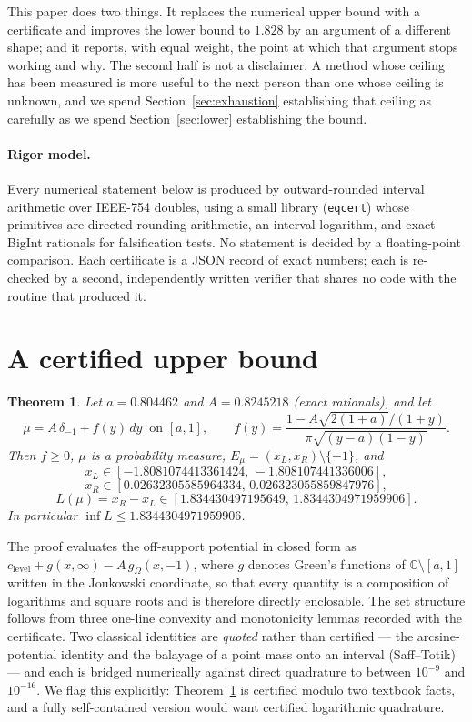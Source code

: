 \documentclass[11pt]{article}
\newtheorem{theorem}{Theorem}
\begin{document}
This paper does two things. It replaces the numerical upper bound with a
certificate and improves the lower bound to $1.828$ by an argument of a
different shape; and it reports, with equal weight, the point at which
that argument stops working and why. The second half is not a
disclaimer. A method whose ceiling has been measured is more useful to
the next person than one whose ceiling is unknown, and we spend
Section~\ref{sec:exhaustion} establishing that ceiling as carefully as we
spend Section~\ref{sec:lower} establishing the bound.

\paragraph{Rigor model.} Every numerical statement below is produced by
outward-rounded interval arithmetic over IEEE-754 doubles, using a small
library (\texttt{eqcert}) whose primitives are directed-rounding
arithmetic, an interval logarithm, and exact BigInt rationals for
falsification tests. No statement is decided by a floating-point
comparison. Each certificate is a JSON record of exact numbers; each is
re-checked by a second, independently written verifier that shares no
code with the routine that produced it.

\section{A certified upper bound}\label{sec:upper}

\begin{theorem}\label{thm:upper}
Let $a=0.804462$ and $A=0.8245218$ (exact rationals), and let
\[
  \mu = A\,\delta_{-1} + f(y)\,dy \ \text{ on } [a,1],
  \qquad
  f(y)=\frac{1-A\sqrt{2(1+a)}/(1+y)}{\pi\sqrt{(y-a)(1-y)}} .
\]
Then $f\ge 0$, $\mu$ is a probability measure, $E_\mu=(x_L,x_R)
\setminus\{-1\}$, and
\[
  x_L\in[-1.8081074413361424,\,-1.808107441336006],
\]
\[
  x_R\in[0.02632305585964334,\,0.026323055859847976],
\]
\[
  L(\mu)=x_R-x_L\in[1.834430497195649,\,1.8344304971959906].
\]
In particular $\inf L\le 1.8344304971959906$.
\end{theorem}

The proof evaluates the off-support potential in closed form as
$c_{\mathrm{level}}+g(x,\infty)-A\,g_\Omega(x,-1)$, where $g$ denotes
Green's functions of $\mathbb{C}\setminus[a,1]$ written in the Joukowski
coordinate, so that every quantity is a composition of logarithms and
square roots and is therefore directly enclosable. The set structure
follows from three one-line convexity and monotonicity lemmas recorded
with the certificate. Two classical identities are \emph{quoted} rather
than certified --- the arcsine-potential identity and the balayage of a
point mass onto an interval (Saff--Totik) --- and each is bridged
numerically against direct quadrature to between $10^{-9}$ and
$10^{-16}$. We flag this explicitly: Theorem~\ref{thm:upper} is
certified modulo two textbook facts, and a fully self-contained version
would want certified logarithmic quadrature.
\end{document}
